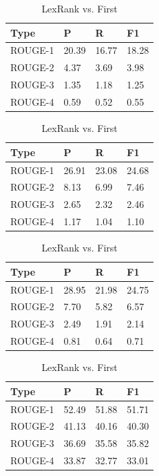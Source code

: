 \documentclass[11pt]{article}
\begin{document}
\begin{table}[h]
\begin{center}
\begin{tabular}{lp{1cm}p{1cm}p{1cm}}
\hline \bf Type & \bf P & \bf R & \bf F1 \\ \hline
ROUGE-1 & 20.39 & 16.77 & 18.28 \\
ROUGE-2 & 4.37 & 3.69 & 3.98\\
ROUGE-3 & 1.35 & 1.18 & 1.25\\
ROUGE-4 & 0.59 & 0.52 & 0.55 \\
\hline
\end{tabular}
\caption{\label{results-table} Random }
\end{center}
\hspace{2em}

\begin{center}
\begin{tabular}{lp{1cm}p{1cm}p{1cm}}
\hline \bf Type & \bf P & \bf R & \bf F1 \\ \hline
ROUGE-1 & 26.91 & 23.08 & 24.68 \\
ROUGE-2 & 8.13 & 6.99 & 7.46\\
ROUGE-3 & 2.65 & 2.32 & 2.46\\
ROUGE-4 & 1.17 & 1.04 & 1.10 \\
\hline
\end{tabular}
\caption{\label{results-table} First }
\end{center}
\hspace{2em}

\begin{center}
\begin{tabular}{lp{1cm}p{1cm}p{1cm}}
\hline \bf Type & \bf P & \bf R & \bf F1 \\ \hline
ROUGE-1 & 28.95 & 21.98 & 24.75 \\
ROUGE-2 & 7.70 & 5.82 & 6.57\\
ROUGE-3 & 2.49 & 1.91 & 2.14\\
ROUGE-4 & 0.81 & 0.64 & 0.71 \\
\hline
\end{tabular}
\caption{\label{results-table} LexRank}
\end{center}
\hspace{2em}

\begin{center}
\begin{tabular}{lp{1cm}p{1cm}p{1cm}}
\hline \bf Type & \bf P & \bf R & \bf F1 \\ \hline
ROUGE-1 & 52.49 & 51.88 & 51.71 \\
ROUGE-2 & 41.13 & 40.16 & 40.30\\
ROUGE-3 & 36.69 & 35.58 & 35.82\\
ROUGE-4 & 33.87 & 32.77 & 33.01 \\
\hline
\end{tabular}
\caption{\label{results-table} LexRank vs. First }
\end{center}
\end{table}
\end{document}
